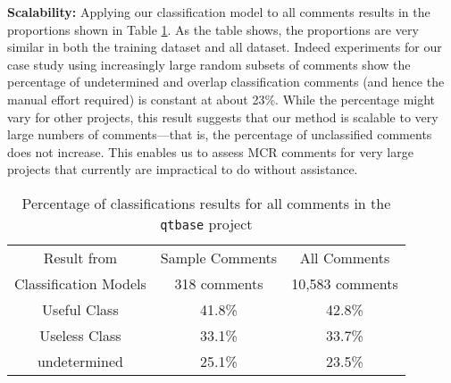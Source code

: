 


\textbf{Scalability:}
Applying our classification model to all comments results in the proportions shown in Table \ref{tb:percent}.
As the table shows, the proportions are very similar in both the training dataset and all dataset. Indeed experiments for our case study using increasingly large random subsets of comments show the percentage of undetermined and overlap classification comments (and hence the manual effort required) is constant at about 23\%.
While the percentage might vary for other projects, this result suggests that our method is scalable to very large numbers of comments---that is, the percentage of unclassified comments does not increase.
This enables us to assess MCR comments for very large projects that currently are impractical to do without assistance. 

\begin{table}[!t]
\caption{Percentage of classifications results for all comments in the \texttt{qtbase} project }
\small
\centering
\def\arraystretch{1.2}
\begin{tabular}{c|c|c}
\hline

Result from & Sample Comments   &  All Comments \\ \cline{2-3}
Classification Models &  318 comments  & 10,583 comments \\ \hline \hline
Useful Class  & 41.8\% & 42.8\% \\
Useless Class   & 33.1\%  & 33.7\% \\
undetermined  & 25.1\% & 23.5\% \\ \hline
\end{tabular}
\label{tb:percent}
\end{table}




